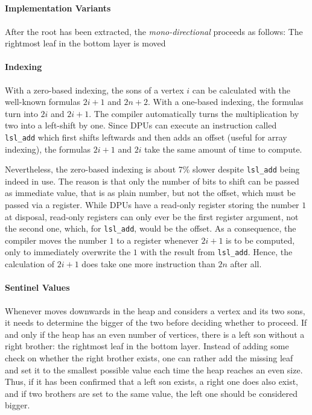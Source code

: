 \subsection{\texorpdfstring{\HS{}}{HeapSort}}
\label{subsec:tasklet:heap}


\paragraph{Implementation Variants}
After the root has been extracted, the \emph{mono-directional} \HS{} proceeds as follows:
The rightmost leaf in the bottom layer is moved

\paragraph{Indexing}
With a zero-based indexing, the sons of a vertex \(i\) can be calculated with the well-known formulas \(2i + 1\) and \(2n + 2\).
With a one-based indexing, the formulas turn into \(2i\) and \(2i + 1\).
The compiler automatically turns the multiplication by two into a left-shift by one.
Since DPUs can execute an instruction called \lstinline|lsl_add| which first shifts leftwards and then adds an offset (useful \eg{} for array indexing), the formulas \(2i + 1\) and \(2i\) take the same amount of time to compute.

Nevertheless, the zero-based indexing is about 7\% slower despite \lstinline|lsl_add| being indeed in use.
The reason is that only the number of bits to shift can be passed as immediate value, that is as plain number, but not the offset, which must be passed via a register.
While DPUs have a read-only register storing the number \(1\) at disposal, read-only registers can only ever be the first register argument, not the second one, which, for \lstinline|lsl_add|, would be the offset.
As a consequence, the compiler moves the number \(1\) to a register whenever \(2i + 1\) is to be computed, only to immediately overwrite the \(1\) with the result from \lstinline|lsl_add|.
Hence, the calculation of \(2i + 1\) does take one more instruction than \(2n\) after all.

\paragraph{Sentinel Values}
Whenever \HS{} moves downwards in the heap and considers a vertex and its two sons, it needs to determine the bigger of the two before deciding whether to proceed.
If and only if the heap has an even number of vertices, there is a left son without a right brother:
the rightmost leaf in the bottom layer.
Instead of adding some check on whether the right brother exists, one can rather add the missing leaf and set it to the smallest possible value each time the heap reaches an even size.
Thus, if it has been confirmed that a left son exists, a right one does also exist, and if two brothers are set to the same value, the left one should be considered bigger.

